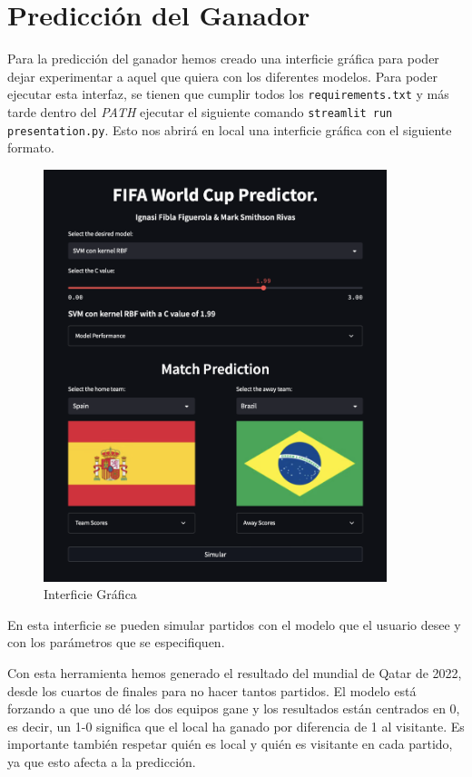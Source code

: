 \section{Predicción del Ganador}
Para la predicción del ganador hemos creado una interficie gráfica para poder dejar experimentar a aquel que quiera con los diferentes modelos. Para poder ejecutar esta interfaz, se tienen que cumplir todos los \texttt{requirements.txt} y más tarde dentro del \textit{PATH} ejecutar el siguiente comando \texttt{streamlit run presentation.py}. Esto nos abrirá en local una interficie gráfica con el siguiente formato.

\begin{figure}[H]
\centering
\includegraphics[width=10cm]{images/webPage.png}
\caption{Interficie Gráfica}
\label{Interficie-grafica}
\end{figure}

En esta interficie se pueden simular partidos con el modelo que el usuario desee y con los parámetros que se especifiquen.
\newline

Con esta herramienta hemos generado el resultado del mundial de Qatar de 2022, desde los cuartos de finales para no hacer tantos partidos. El modelo está forzando a que uno dé los dos equipos gane y los resultados están centrados en 0, es decir, un 1-0 significa que el local ha ganado por diferencia de 1 al visitante. Es importante también respetar quién es local y quién es visitante en cada partido, ya que esto afecta a la predicción.
\newline


